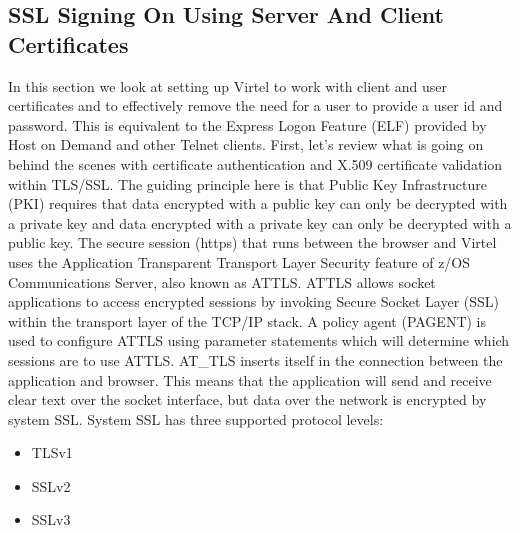 \documentclass[letterpaper,10pt,english]{sphinxmanual}
\begin{document}
\subsection{SSL \sphinxhyphen{} Signing On Using Server And Client Certificates}
\label{\detokenize{Customization:ssl-signing-on-using-server-and-client-certificates}}\label{\detokenize{Customization:index-105}}
\sphinxAtStartPar
In this section we look at setting up Virtel to work with client and user certificates and to effectively remove the need for a user to provide a user id and password. This is equivalent to the Express Logon Feature (ELF) provided by Host on Demand and other Telnet clients. First, let’s review what is going on behind the scenes with certificate authentication and X.509 certificate validation within TLS/SSL. The guiding principle here is that Public Key Infrastructure (PKI) requires that data encrypted with a
public key can only be decrypted with a private key and data encrypted with a private key can only be decrypted with a public key. The secure session (https) that runs between the browser and Virtel uses the Application Transparent Transport Layer Security feature of z/OS Communications Server, also known as AT\sphinxhyphen{}TLS. AT\sphinxhyphen{}TLS allows socket applications to access encrypted sessions by invoking Secure Socket Layer (SSL) within the transport layer of the TCP/IP stack. A policy agent (PAGENT) is used to configure AT\sphinxhyphen{}TLS using parameter statements which will determine which sessions are to use AT\sphinxhyphen{}TLS. AT\_TLS inserts itself in the connection between the application and browser. This means that the application will send and receive clear text over the socket interface, but data over the network is encrypted by system SSL. System SSL has three supported protocol levels:
\begin{itemize}
\item {} 
\sphinxAtStartPar
TLSv1

\item {} 
\sphinxAtStartPar
SSLv2

\item {} 
\sphinxAtStartPar
SSLv3

\end{itemize}
\end{document}
